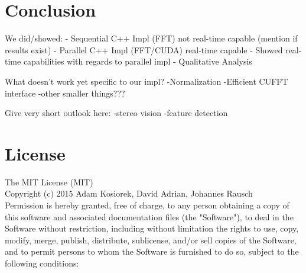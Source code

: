 \documentclass[a4paper,twoside, openright,12pt]{report}
\begin{document}








\chapter{Conclusion}

We did/showed:
- Sequential C++ Impl (FFT) not real-time capable (mention if results exist)
- Parallel C++ Impl (FFT/CUDA) real-time capable
- Showed real-time capabilities with regards to parallel impl
- Qualitative Analysis

What doesn't work yet specific to our impl? 
-Normalization
-Efficient CUFFT interface
-other smaller things???

Give very short outlook here:
-stereo vision
-feature detection



\cleardoublepage
{}
\listoffigures 	 %


\cleardoublepage
{}




\cleardoublepage
\chapter*{License}
The MIT License (MIT)\\

Copyright (c) 2015 Adam Kosiorek, David Adrian, Johannes Rausch\\

Permission is hereby granted, free of charge, to any person obtaining a copy of this software and associated documentation files (the "Software"), to deal in the Software without restriction, including without limitation the rights to use, copy, modify, merge, publish, distribute, sublicense, and/or sell copies of the Software, and to permit persons to whom the Software is furnished to do so, subject to the following conditions:\\
\end{document}
